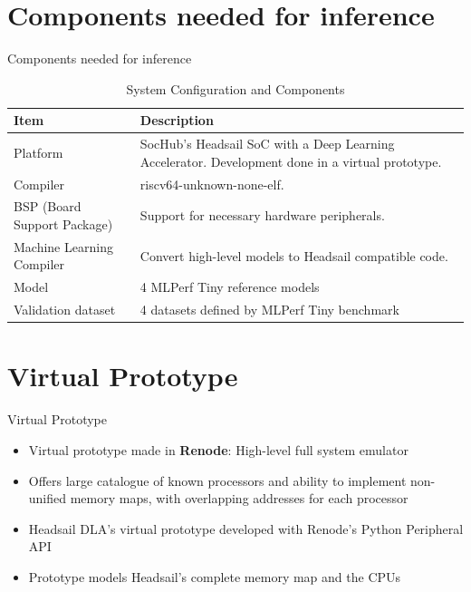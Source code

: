 \section{Components needed for inference}
\begin{frame}{Components needed for inference}
\begin{table}[ht]
\centering
\caption{System Configuration and Components}
\begin{tabular}{|l|p{8cm}|}
\hline
\textbf{Item} & \textbf{Description} \\ \hline
Platform & SocHub's Headsail SoC with a Deep Learning Accelerator. Development done in a virtual prototype. \\ \hline
Compiler & riscv64-unknown-none-elf. \\ \hline
BSP (Board Support Package) & Support for necessary hardware peripherals. \\ \hline
Machine Learning Compiler & Convert high-level models to Headsail compatible code. \\ \hline
Model & 4 MLPerf Tiny reference models \\ \hline
Validation dataset &  4 datasets defined by MLPerf Tiny benchmark  \\ \hline
\end{tabular}
\label{tab:system_components}
\end{table}
\end{frame}

\section{Virtual Prototype}
\begin{frame}{Virtual Prototype}
  \begin{itemize}
    \item Virtual prototype made in \textbf{Renode}: High-level full system emulator
    \item Offers large catalogue of known processors and ability to implement non-unified memory maps, with overlapping addresses for each processor
    \item Headsail DLA's virtual prototype developed with Renode's Python Peripheral API
    \item Prototype models Headsail's complete memory map and the CPUs
  \end{itemize}
\end{frame}

